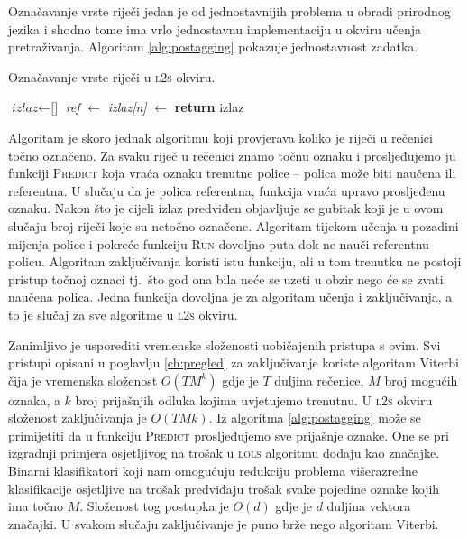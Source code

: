 Označavanje vrste riječi jedan je od jednostavnijih problema u obradi prirodnog
jezika i shodno tome ima vrlo jednostavnu implementaciju u okviru učenja
pretraživanja. Algoritam \ref{alg:postagging} pokazuje jednostavnost zadatka.

\begin{algorithm}
\caption{Označavanje vrste riječi u \textsc{l2s} okviru.}\label{alg:postagging}
\begin{algorithmic}[1]
\State $\textit{izlaz} \gets \text{[]}$
  \State \textit{ref} $\gets$ 
  \State \textit{izlaz[n]} $\gets$ 
\EndFor
\State {}
\State \textbf{return} izlaz
\EndFunction
\end{algorithmic}
\end{algorithm}

Algoritam je skoro jednak algoritmu koji provjerava koliko je riječi u rečenici
točno označeno. Za svaku riječ u rečenici znamo točnu oznaku i prosljeđujemo ju
funkciji \textsc{Predict} koja vraća oznaku trenutne police -- polica može biti
naučena ili referentna. U slučaju da je polica referentna, funkcija vraća upravo
prosljeđenu oznaku. Nakon što je cijeli izlaz predviđen objavljuje se gubitak
koji je u ovom slučaju broj riječi koje su netočno označene. Algoritam tijekom
učenja u pozadini mijenja police i pokreće funkciju \textsc{Run} dovoljno puta
dok ne nauči referentnu policu. Algoritam zaključivanja koristi istu funkciju,
ali u tom trenutku ne postoji pristup točnoj oznaci tj.~što god ona bila neće se
uzeti u obzir nego će se zvati naučena polica. Jedna funkcija dovoljna je za
algoritam učenja i zaključivanja, a to je slučaj za sve algoritme u \textsc{l2s}
okviru.

Zanimljivo je usporediti vremenske složenosti uobičajenih pristupa s ovim. Svi
pristupi opisani u poglavlju \ref{ch:pregled} za zaključivanje koriste algoritam
Viterbi čija je vremenska složenost $O(T M ^ k)$ gdje je $T$ duljina rečenice,
$M$ broj mogućih oznaka, a $k$ broj prijašnjih odluka kojima uvjetujemo
trenutnu. U \textsc{l2s} okviru složenost zaključivanja je $O(T M k)$. Iz
algoritma \ref{alg:postagging} može se primijetiti da u funkciju
\textsc{Predict} prosljeđujemo  sve prijašnje oznake. One se pri izgradnji
primjera osjetljivog na trošak u \textsc{lols} algoritmu dodaju kao značajke.
Binarni klasifikatori koji nam omogućuju redukciju problema višerazredne
klasifikacije osjetljive na trošak predviđaju trošak svake pojedine oznake kojih
ima točno $M$. Složenost tog postupka je $O(d)$ gdje je $d$ duljina vektora
značajki. U svakom slučaju zaključivanje je puno brže nego algoritam Viterbi.


